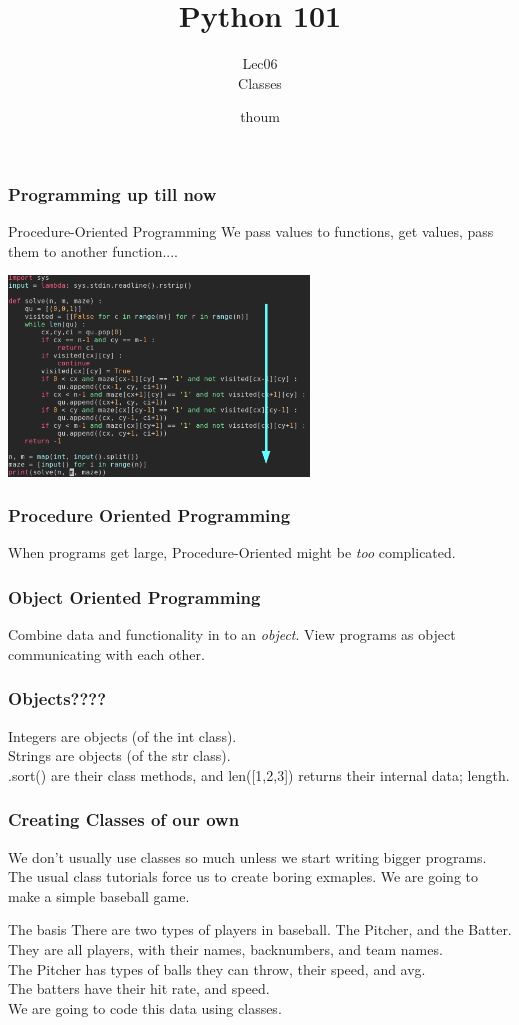 \documentclass{beamer}
\title{Python 101}
\subtitle{Lec06 \\ Classes}
\author{thoum}
\begin{document}
\frame{\titlepage}

\begin{frame}
\frametitle{Programming up till now}
Procedure-Oriented Programming
We pass values to functions, get values, pass them to another function....
  \begin{center}
  \includegraphics[width=80mm]{./code.png}
  \end{center}
\end{frame}

\begin{frame}
\frametitle{Procedure Oriented Programming}
  When programs get large, Procedure-Oriented might be \textit{too}
  complicated.\\
\end{frame}

\begin{frame}
\frametitle{Object Oriented Programming}
  Combine data and functionality in to an \textit{object}.
  View programs as object communicating with each other.
\end{frame}

\begin{frame}
\frametitle{Objects????}
  Integers are objects (of the int class).\\
  Strings are objects (of the str class).\\
  [1,2,3].sort() are their class methods, and len([1,2,3]) returns their
  internal data; length.
\end{frame}

\begin{frame}
\frametitle{Creating Classes of our own}
  We don't usually use classes so much unless we start writing bigger programs.
  The usual class tutorials force us to create boring exmaples.
  We are going to make a simple baseball game.
\end{frame}

\begin{frame}{The basis}
  There are two types of players in baseball.
  The Pitcher, and the Batter. They are all players, with their names,
  backnumbers, and team names.\\
  The Pitcher has types of balls they can throw, their speed, and avg.\\
  The batters have their hit rate, and speed.\\
  We are going to code this data using classes.
\end{frame}
\end{document}
